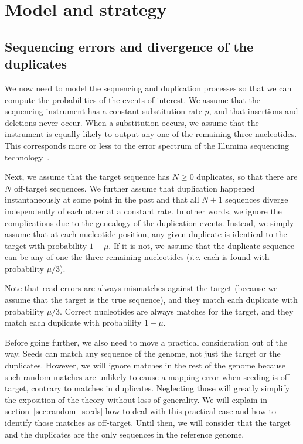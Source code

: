 \documentclass{article}
\begin{document}
\section{Model and strategy}
\label{sec:symbolic}

\subsection{Sequencing errors and divergence of the duplicates}
\label{sec:error}

We now need to model the sequencing and duplication processes so that
we can compute the probabilities of the events of interest. We assume that
the sequencing instrument has a constant substitution rate $p$, and that
insertions and deletions never occur. When a substitution occurs, we
assume that the instrument is equally likely to output any one of the
remaining three nucleotides. This corresponds more or less to the error
spectrum of the Illumina sequencing technology~\cite{pmid21576222}.

Next, we assume that the target sequence has $N \geq 0$ duplicates, so
that there are $N$ off-target sequences. We further assume that
duplication happened instantaneously at some point in the past and that
all $N+1$ sequences diverge independently of each other at a constant
rate. In other words, we ignore the complications due to the genealogy of
the duplication events. Instead, we simply assume that at each nucleotide
position, any given duplicate is identical to the target with probability
$1-\mu$. If it is not, we assume that the duplicate sequence can be any of
one the three remaining nucleotides (\textit{i.e.} each is found with
probability $\mu/3$).

Note that read errors are always mismatches against the target (because we
assume that the target is the true sequence), and they match each
duplicate with probability $\mu/3$. Correct nucleotides are always matches
for the target, and they match each duplicate with probability $1-\mu$.

Before going further, we also need to move a practical consideration out
of the way. Seeds can match any sequence of the genome, not just the
target or the duplicates. However, we will ignore matches in the rest of
the genome because such random matches are unlikely to cause a mapping
error when seeding is off-target, contrary to matches in duplicates.
Neglecting those will greatly simplify the exposition of the theory
without loss of generality. We will explain in
section~\ref{sec:random_seeds} how to deal with this practical case and
how to identify those matches as off-target. Until then, we will consider
that the target and the duplicates are the only sequences in the reference
genome.
\end{document}
